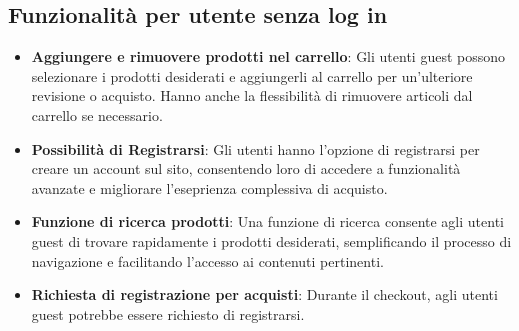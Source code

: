 \subsection{Funzionalità per utente senza log in}
\begin{itemize}
    \item \textbf{Aggiungere e rimuovere prodotti nel carrello}: Gli utenti guest possono selezionare i prodotti desiderati e aggiungerli al carrello per un'ulteriore revisione o acquisto. Hanno anche la flessibilità di rimuovere articoli dal carrello se necessario.
    \item \textbf{Possibilità di Registrarsi}: Gli utenti hanno l'opzione di registrarsi per creare un account sul sito, consentendo loro di accedere a funzionalità avanzate e migliorare l'eseprienza complessiva di acquisto.
    \item \textbf{Funzione di ricerca prodotti}: Una funzione di ricerca consente agli utenti guest di trovare rapidamente i prodotti desiderati, semplificando il processo di navigazione e facilitando l'accesso ai contenuti pertinenti.
    \item \textbf{Richiesta di registrazione per acquisti}: Durante il checkout, agli utenti guest potrebbe essere richiesto di registrarsi.
\end{itemize}